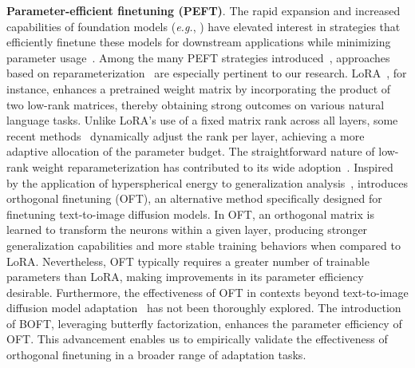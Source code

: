 \textbf{Parameter-efficient finetuning (PEFT)}. The rapid expansion and increased capabilities of foundation models (\emph{e.g.}, \cite{brown2020language,radford2021learning,rombach2022high,kirillov2023segment}) have elevated interest in strategies that efficiently finetune these models for downstream applications while minimizing parameter usage~\cite{treviso2023efficient,ding2023parameter,lialin2023scaling}. Among the many PEFT strategies introduced~\cite{houlsby2019parameter,aghajanyan2020intrinsic,hulora2022,edalati2022krona,wang2022adamix,gheini2021cross,zaken2022bitfit,guo2020parameter,sung2021training,ansell2022composable,lester2021power,li2021prefix,vu2022spot,he2021towards,mao2021unipelt,karimi2021compacter,liu2022few,sung2022lst,chen2022parameter,jia2022visual,chen2022adaptformer,zhang2022neural,jie2023fact,lian2022scaling,luo2023towards}, approaches based on reparameterization~\cite{aghajanyan2020intrinsic,hulora2022,edalati2022krona} are especially pertinent to our research. LoRA~\cite{hulora2022}, for instance, enhances a pretrained weight matrix by incorporating the product of two low-rank matrices, thereby obtaining strong outcomes on various natural language tasks. Unlike LoRA’s use of a fixed matrix rank across all layers, some recent methods~\cite{zhang2022adaptive,valipour2022dylora,zhang2023increlora} dynamically adjust the rank per layer, achieving a more adaptive allocation of the parameter budget. The straightforward nature of low-rank weight reparameterization has contributed to its wide adoption~\cite{dettmers2023qlora,zi2023delta,chavan2023one}. Inspired by the application of hyperspherical energy to generalization analysis~\cite{liu2018learning,liu2021orthogonal}, \cite{qiu2023controlling} introduces orthogonal finetuning (OFT), an alternative method specifically designed for finetuning text-to-image diffusion models. In OFT, an orthogonal matrix is learned to transform the neurons within a given layer, producing stronger generalization capabilities and more stable training behaviors when compared to LoRA. Nevertheless, OFT typically requires a greater number of trainable parameters than LoRA, making improvements in its parameter efficiency desirable. Furthermore, the effectiveness of OFT in contexts beyond text-to-image diffusion model adaptation~\cite{qiu2023controlling} has not been thoroughly explored. The introduction of BOFT, leveraging butterfly factorization, enhances the parameter efficiency of OFT. This advancement enables us to empirically validate the effectiveness of orthogonal finetuning in a broader range of adaptation tasks.

